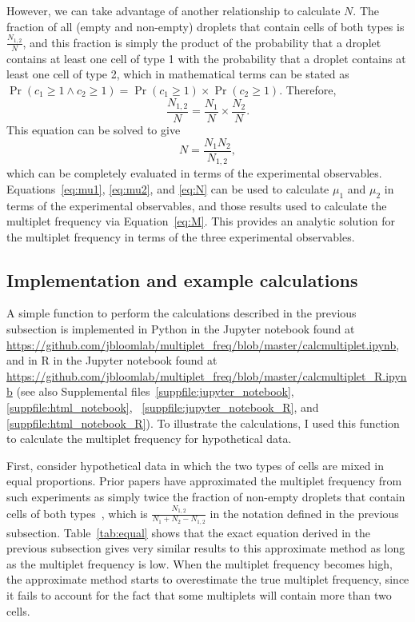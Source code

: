 \documentclass[fleqn,10pt]{wlpeerj} %
\begin{document}
However, we can take advantage of another relationship to calculate $N$.
The fraction of all (empty and non-empty) droplets that contain cells of both types is $\frac{N_{1,2}}{N}$, and this fraction is simply the product of the probability that a droplet contains at least one cell of type 1 with the probability that a droplet contains at least one cell of type 2, which in mathematical terms can be stated as $\Pr\left(c_1 \ge 1 \land c_2 \ge 1\right) = \Pr\left(c_1 \ge 1\right) \times \Pr\left(c_2 \ge 1\right)$.
Therefore,
\begin{equation}
\frac{N_{1,2}}{N} = \frac{N_1}{N} \times \frac{N_2}{N}.
\end{equation}
This equation can be solved to give
\begin{equation}
\label{eq:N}
N = \frac{N_1 N_2}{N_{1,2}},
\end{equation}
which can be completely evaluated in terms of the experimental observables.
Equations~\ref{eq:mu1}, \ref{eq:mu2}, and \ref{eq:N} can be used to calculate $\mu_1$ and $\mu_2$ in terms of the experimental observables, and those results used to calculate the multiplet frequency via Equation~\ref{eq:M}.
This provides an analytic solution for the multiplet frequency in terms of the three experimental observables.

\subsection*{Implementation and example calculations}
A simple function to perform the calculations described in the previous subsection is implemented in Python in the Jupyter notebook found at
\url{https://github.com/jbloomlab/multiplet_freq/blob/master/calcmultiplet.ipynb}, and in R in the Jupyter notebook found at \url{https://github.com/jbloomlab/multiplet_freq/blob/master/calcmultiplet_R.ipynb} (see also Supplemental files~\ref{suppfile:jupyter_notebook}, \ref{suppfile:html_notebook}, ~\ref{suppfile:jupyter_notebook_R}, and \ref{suppfile:html_notebook_R}).
To illustrate the calculations, I used this function to calculate the multiplet frequency for hypothetical data.

First, consider hypothetical data in which the two types of cells are mixed in equal proportions.
Prior papers have approximated the multiplet frequency from such experiments as simply twice the fraction of non-empty droplets that contain cells of both types~\citep{klein2015droplet,macosko2015highly,zheng2017massively,cao2017comprehensive}, which is $\frac{N_{1,2}}{N_1 + N_2 - N_{1,2}}$ in the notation defined in the previous subsection. 
Table~\ref{tab:equal} shows that the exact equation derived in the previous subsection gives very similar results to this approximate method as long as the multiplet frequency is low.
When the multiplet frequency becomes high, the approximate method starts to overestimate the true multiplet frequency, since it fails to account for the fact that some multiplets will contain more than two cells.
\end{document}

